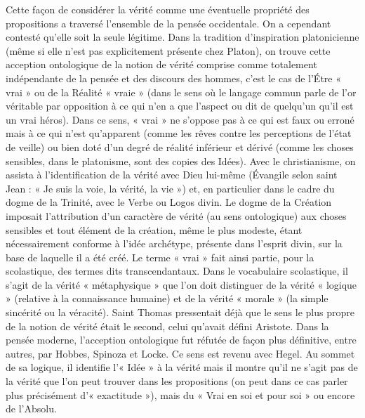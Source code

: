Cette façon de considérer la vérité
comme une éventuelle propriété des propositions
a traversé l’ensemble de la pensée
occidentale. On a cependant contesté
qu’elle soit la seule légitime. Dans la tradition
d’inspiration platonicienne (même
si elle n’est pas explicitement présente
chez Platon), on trouve cette acception
ontologique de la notion de vérité
comprise comme totalement indépendante
de la pensée et des discours des
hommes, c’est le cas de l’Étre « vrai » ou
de la Réalité « vraie » (dans le sens où le
langage commun parle de l’or véritable
par opposition à ce qui n’en a que l’aspect
ou dit de quelqu'un qu’il est un vrai
héros). Dans ce sens, « vrai » ne s’oppose
pas à ce qui est faux ou erroné mais à ce
qui n’est qu'apparent (comme les rêves
contre les perceptions de l’état de veille)
ou bien doté d’un degré de réalité inférieur
et dérivé (comme les choses sensibles,
dans le platonisme, sont des copies
des Idées). Avec le christianisme, on
assista à l’identification de la vérité avec
Dieu lui-même (Évangile selon saint
Jean : « Je suis la voie, la vérité, la vie »)
et, en particulier dans le cadre du dogme
de la Trinité, avec le Verbe ou Logos
divin. Le dogme de la Création imposait
l'attribution d’un caractère de vérité (au
sens ontologique) aux choses sensibles et
tout élément de la création, même le plus
modeste, étant nécessairement conforme
à l’idée archétype, présente dans l’esprit
divin, sur la base de laquelle il a été créé.
Le terme « vrai » fait ainsi partie, pour la
scolastique, des termes dits transcendantaux.
Dans le vocabulaire scolastique, il
s’agit de la vérité « métaphysique » que
l’on doit distinguer de la vérité « logique »
(relative à la connaissance humaine) et de
la vérité « morale » (la simple sincérité ou
la véracité). Saint Thomas pressentait
déjà que le sens le plus propre de la
notion de vérité était le second, celui
qu'avait défini Aristote. Dans la pensée
moderne, l’acception ontologique fut
réfutée de façon plus définitive, entre
autres, par Hobbes, Spinoza et Locke. Ce
sens est revenu avec Hegel. Au sommet
de sa logique, il identifie l’« Idée » à la
vérité mais il montre qu’il ne s’agit pas de
la vérité que l’on peut trouver dans les
propositions (on peut dans ce cas parler
plus précisément d’« exactitude »), mais
du « Vrai en soi et pour soi » ou encore
de l’Absolu.


